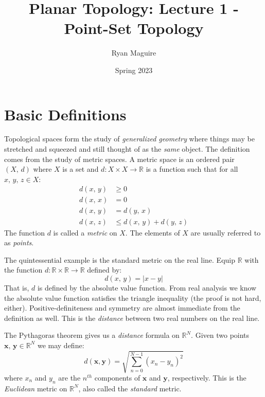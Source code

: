 \documentclass{article}
\title{Planar Topology: Lecture 1 - Point-Set Topology}
\author{Ryan Maguire}
\date{Spring 2023}
\theoremstyle{plain}
\theoremstyle{normal}
\newenvironment{example}{%
    \pushQED{\qed}\renewcommand{\qedsymbol}{$\blacksquare$}\examplex%
}{%
    \popQED\endexamplex%
}
\newenvironment{definition}{%
    \pushQED{\qed}\renewcommand{\qedsymbol}{$\blacksquare$}\definitionx%
}{%
    \popQED\enddefinitionx%
}
\begin{document}
    \maketitle
    \tableofcontents
    \listoffigures
    \section{Basic Definitions}
        Topological spaces form the study of \textit{generalized geometry}
        where things may be stretched and squeezed and still thought of as the
        \textit{same} object. The definition comes from the study of metric
        spaces.
        \begin{definition}[Metric Spaces]
            A metric space is an ordered pair $(X,\,d)$ where $X$ is a set and
            $d:X\times{X}\rightarrow\mathbb{R}$ is a function such that for all
            $x,\,y,\,z\in{X}$:
            \begin{align}
                d(x,\,y)&\geq{0}\tag{Positivity}\\
                d(x,\,x)&=0\tag{Definiteness}\\
                d(x,\,y)&=d(y,\,x)\tag{Symmetry}\\
                d(x,\,z)&\leq{d}(x,\,y)+d(y,\,z)\tag{Triangle Inequality}
            \end{align}
            The function $d$ is called a \textit{metric} on $X$. The elements of
            $X$ are usually referred to as \textit{points}.%
        \end{definition}
        \begin{example}
            The quintessential example is the standard metric on the real line.
            Equip $\mathbb{R}$ with the function
            $d:\mathbb{R}\times\mathbb{R}\rightarrow\mathbb{R}$ defined by:
            \begin{equation}
                d(x,\,y)=|x-y|
            \end{equation}
            That is, $d$ is defined by the absolute value function. From real
            analysis we know the absolute value function satisfies the triangle
            inequality (the proof is not hard, either). Positive-definiteness
            and symmetry are almost immediate from the definition as well.
            This is the \textit{distance} between two real numbers on the
            real line.
        \end{example}
        \begin{example}
            The Pythagoras theorem gives us a \textit{distance} formula on
            $\mathbb{R}^{N}$. Given two points
            $\mathbf{x},\,\mathbf{y}\in\mathbb{R}^{N}$ we may define:
            \begin{equation}
                d(\mathbf{x},\mathbf{y})
                =\sqrt{\sum_{n=0}^{N-1}(x_{n}-y_{n})^{2}}
            \end{equation}
            where $x_{n}$ and $y_{n}$ are the $n^{th}$ components of
            $\mathbf{x}$ and $\mathbf{y}$, respectively. This is the
            \textit{Euclidean} metric on $\mathbb{R}^{N}$, also called the
            \textit{standard} metric.
        \end{example}
\end{document}
